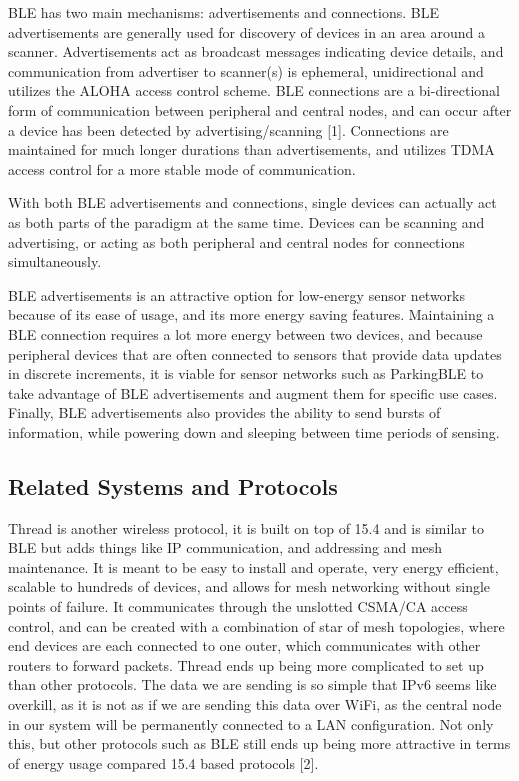 \documentclass[sigconf]{acmart}
\begin{document}
BLE has two main mechanisms: advertisements and connections. BLE advertisements are generally used for
discovery of devices in an area around a scanner. Advertisements act as broadcast messages indicating
device details, and communication from advertiser to scanner(s) is ephemeral, unidirectional and utilizes
the ALOHA access control scheme. BLE connections are a bi-directional form of communication between
peripheral and central nodes, and can occur after a device has been detected by advertising/scanning [1].
Connections are maintained for much longer durations than advertisements,
and utilizes TDMA access control for a more stable mode of communication. \newline

With both BLE advertisements and connections, single devices can actually act as both parts of the
paradigm at the same time. Devices can be scanning and advertising, or acting as both peripheral and
central nodes for connections simultaneously. \newline

BLE advertisements is an attractive option for low-energy sensor networks because of its ease
of usage, and its more energy saving features. Maintaining a BLE connection requires a lot
more energy between two devices, and because peripheral devices that are often connected to sensors that
provide data updates in discrete increments, it is viable for sensor networks such as ParkingBLE to
take advantage of BLE advertisements and augment them for specific use cases.
Finally, BLE advertisements also provides the ability to send bursts of information,
while powering down and sleeping between time periods of sensing.


\subsection{Related Systems and Protocols}
Thread is another wireless protocol, it is built on top of 15.4 and is similar to BLE but adds things
like IP communication, and addressing and mesh maintenance. It is meant to be easy to install and operate,
very energy efficient, scalable to hundreds of devices, and allows for mesh networking without single
points of failure. It communicates through the unslotted CSMA/CA access control, and can be created with
a combination of star of mesh topologies, where end devices are each connected to one outer, which
communicates with other routers to forward packets. Thread ends up being more complicated to set up than
other protocols. The data we are sending is so simple that IPv6 seems like overkill, as it is not as if we
are sending this data over WiFi, as the central node in our system will be permanently connected to a LAN configuration.
Not only this, but other protocols such as BLE still ends up being more attractive in terms of energy usage compared
15.4 based protocols [2]. \newline
\end{document}
